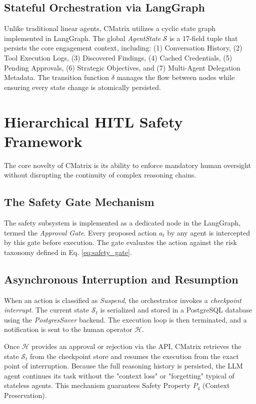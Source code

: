 \subsection{Stateful Orchestration via LangGraph}
Unlike traditional linear agents, CMatrix utilizes a cyclic state graph implemented in LangGraph. The global \textit{AgentState} $\mathcal{S}$ is a 17-field tuple that persists the core engagement context, including: (1) Conversation History, (2) Tool Execution Logs, (3) Discovered Findings, (4) Cached Credentials, (5) Pending Approvals, (6) Strategic Objectives, and (7) Multi-Agent Delegation Metadata. The transition function $\delta$ manages the flow between nodes while ensuring every state change is atomically persisted.

\section{Hierarchical HITL Safety Framework}
\label{sec:safety_framework}

The core novelty of CMatrix is its ability to enforce mandatory human oversight without disrupting the continuity of complex reasoning chains.

\subsection{The Safety Gate Mechanism}
The safety subsystem is implemented as a dedicated node in the LangGraph, termed the \textit{Approval Gate}. Every proposed action $a_t$ by any agent is intercepted by this gate before execution. The gate evaluates the action against the risk taxonomy defined in Eq. \ref{eq:safety_gate}.



\subsection{Asynchronous Interruption and Resumption}
When an action is classified as \textit{Suspend}, the orchestrator invokes a \textit{checkpoint interrupt}. The current state $\mathcal{S}_t$ is serialized and stored in a PostgreSQL database using the \textit{PostgresSaver} backend. The execution loop is then terminated, and a notification is sent to the human operator $\mathcal{H}$.

Once $\mathcal{H}$ provides an approval or rejection via the API, CMatrix retrieves the state $\mathcal{S}_t$ from the checkpoint store and resumes the execution from the exact point of interruption. Because the full reasoning history is persisted, the LLM agent continues its task without the "context loss" or "forgetting" typical of stateless agents. This mechanism guarantees Safety Property $P_4$ (Context Preservation).

